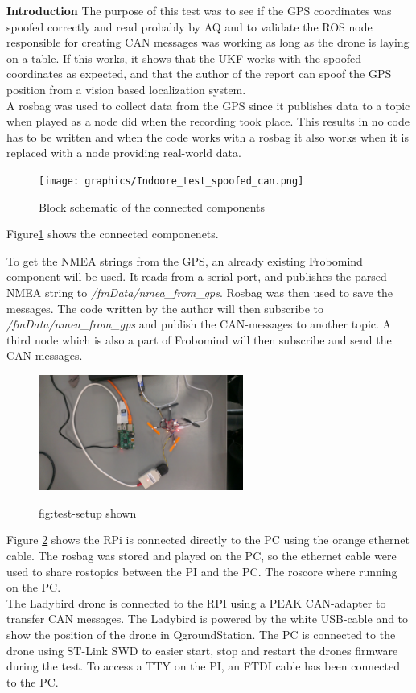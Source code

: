 \textbf{Introduction}
The purpose of this test was to see if the GPS coordinates was spoofed correctly and read probably by AQ and to validate the ROS node responsible for creating CAN messages was working as long as the drone is laying on a table. If this works, it shows that the UKF works with the spoofed coordinates as expected, and that the author of the report can spoof the GPS position from a vision based localization system. \\

A rosbag was used to collect data from the GPS since it publishes data to a topic when played as a node did when the recording took place. This results in no code has to be written and when the code works with a rosbag it also works when it is replaced with a node providing real-world data. \\

\begin{figure}[H]
    \center
    \texttt{[image: graphics/Indoore\_test\_spoofed\_can.png]}
    \caption{Block schematic of the connected components}
    \label{fig:test_block}
\end{figure}


Figure\ref{fig:test_block} shows the connected componenets. 


To get the NMEA strings from the GPS, an already existing Frobomind component will be used. It reads from a serial port, and publishes the parsed NMEA string to \textit{/fmData/nmea\_from\_gps}. Rosbag was then used to save the messages.
The code written by the author will then subscribe to \textit{/fmData/nmea\_from\_gps} and publish the CAN-messages to another topic. A third node which is also a part of Frobomind will then subscribe and send the CAN-messages.

\begin{figure}[H]
    \center
    \includegraphics[width=0.6\textwidth]{graphics/test_test_setup_hw.jpg}
  \label{fig:test_setup_indoor}
  \caption{fig:test-setup shown}
\end{figure}


Figure \ref{fig:test_setup_indoor} shows the RPi is connected directly to the PC using the orange ethernet cable.
The rosbag was stored and played on the PC, so the ethernet cable were used to share rostopics between the PI and the PC. The roscore where running on the PC.\\
The Ladybird drone is connected to the RPI using a PEAK CAN-adapter to transfer CAN messages. The Ladybird is powered by the white USB-cable and to show the position of the drone in QgroundStation. The PC is connected to the drone using ST-Link SWD to easier start, stop and restart the drones firmware during the test. To access a \ac{TTY} on the PI, an FTDI cable has been connected to the PC.


